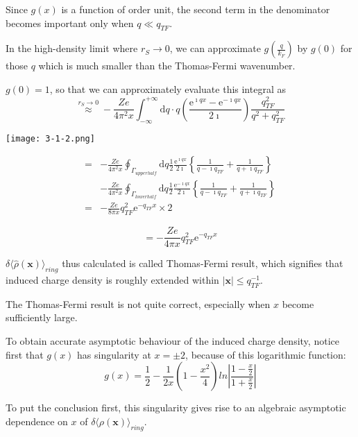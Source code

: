 \begin{itemize}
Since $g(x)$ is a function of order unit, the second term in the denominator becomes important only when $q \ll q_{TF}$.

In the high-density limit where $r_S \rightarrow 0$, we can approximate $g(\frac{q}{k_F})$ by $g(0)$ for those $q$ which is much smaller than the Thomas-Fermi wavenumber.

$g(0)=1$, so that we can approximately evaluate this integral as
\[\overset{r_S \rightarrow 0}{\approx} - \frac{Z e}{4\pi^2 x} \int_{-\infty}^{+\infty}\mathrm{d}q \cdot q\left( \frac{\mathrm{e}^{\imath qx}-\mathrm{e}^{-\imath qx}}{2\imath} \right)\frac{q_{TF}^2}{q^2+q_{TF}^2}\]

\begin{center} \label{Fig3.1.2}
\texttt{[image: 3-1-2.png]}
\end{center}

\[\begin{split}
=& - \frac{Z e}{4\pi^2 x}\oint_{\Gamma_{upper half}} \mathrm{d}q \frac{1}{2}\frac{\mathrm{e}^{\imath q x}}{2\imath}\left\{ \frac{1}{q-\imath q_{TF}}+\frac{1}{q+\imath q_{TF}} \right\}\\
&-\frac{Z e}{4\pi^2 x}\oint_{\Gamma_{lower half}} \mathrm{d}q \frac{1}{2}\frac{\mathrm{e}^{-\imath q x}}{2\imath}\left\{ \frac{1}{q-\imath q_{TF}}+\frac{1}{q+\imath q_{TF}} \right\}\\
=& - \frac{Z e}{8 \pi x}q_{TF}^2 \mathrm{e}^{-q_{TF} x} \times 2
\end{split}\]

\begin{equation} \label{Eqs3.1.29}
=- \frac{Z e}{4 \pi x}q_{TF}^2 \mathrm{e}^{-q_{TF} x}
\end{equation}

$\delta \langle \hat{\rho}(\mathbf{x}) \rangle_{ring}$ thus calculated is called Thomas-Fermi result, which signifies that induced charge density is roughly extended within $|\mathbf{x}| \leq q_{TF}^{-1}$.

The Thomas-Fermi result is not quite correct, especially when $x$ become sufficiently large.

To obtain accurate asymptotic behaviour of the induced charge density, notice first that $g(x)$ has singularity at $x=\pm 2$, because of this logarithmic function:
\[ g(x) = \frac{1}{2} - \frac{1}{2x} \left( 1-\frac{x^2}{4} \right) ln \left| \frac{1-\frac{x}{2}}{1+\frac{x}{2}} \right| \]

To put the conclusion first, this singularity gives rise to an algebraic asymptotic dependence on $x$ of $\delta\langle \rho(\mathbf{x})\rangle_{ring}$.


\end{itemize}
